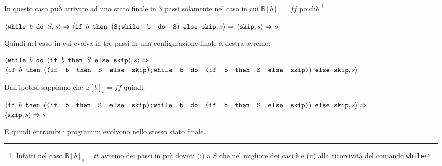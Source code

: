 {	 In questo caso  può arrivare ad uno stato finale
	in 3 passi solamente nel caso in cui $\mathbb{B}[b]_s=ff$ poichè
	\footnote{Infatti nel caso $\mathbb{B}[b]_s=tt$ avremo dei passi in più 
	dovuti (i) a $S$ che nel migliore dei casi è \skipistr{} e (ii) alla
	ricorsività del comando \texttt{while}}
	\begin{center}
	$\confSs{\wbS{b}{S}}{s}\Rar{}
	\confSs{
		\ifABC{b}
			{(\concat{S}{\wbS{b}{S}})}
			{\skipistr}
	}{s}\Rar{}
	\confSs{\skipistr}{s}\Rar{}s$
	\end{center}
	Quindi nel caso in cui  evolva in tre passi in una
	configurazione finale a destra avremo:
	\begin{center}
	$\confSs{\wbS{b}{(\ifABC{b}{S}{\skipistr})}}{s}\Rar{}$\\
	$\confSs{
		\ifABC{b}
		{(\concat{(\ifABC{b}{S}{\skipistr})}
		{\wbS{b}{(\ifABC{b}{S}{\skipistr})}})}
		{\skipistr}
	}{s}$
	\end{center}
	Dall'ipotesi sappiamo che $\mathbb{B}[b]_s=ff$ quindi:
	\begin{center}
	$\confSs{
		\ifABC{b}
		{(\concat{(\ifABC{b}{S}{\skipistr})}
		{\wbS{b}{(\ifABC{b}{S}{\skipistr})}})}
		{\skipistr}
	}{s}\Rar{}$ \\
	$\confSs{\skipistr}{s}\Rar{}{s}$
	\end{center}
	E quindi entrambi i programmi evolvono nello stesso stato finale.\\

}
